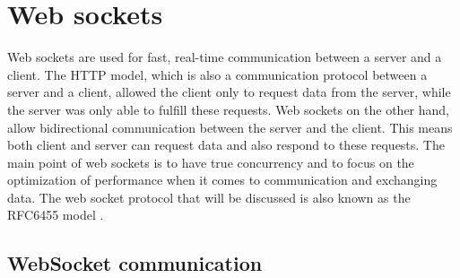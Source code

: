 \documentclass[a4paper, 11pt]{report}
\begin{document}
\section{Web sockets}
Web sockets are used for fast, real-time communication between a server and a client. The HTTP model, which is also a communication protocol between a server and a client, allowed the client only to request data from the server, while the server was only able to fulfill these requests. Web sockets on the other hand, allow bidirectional communication  between the server and the client. This means both client and server can request data and also respond to these requests. The main point of web sockets is to have true concurrency and to focus on the optimization of performance when it comes to communication and exchanging data. The web socket protocol that will be discussed is also known as the RFC6455 model \cite{RFC6455}.

	\subsection{WebSocket communication}\label{subsec:WebSocketCom}
\end{document}
